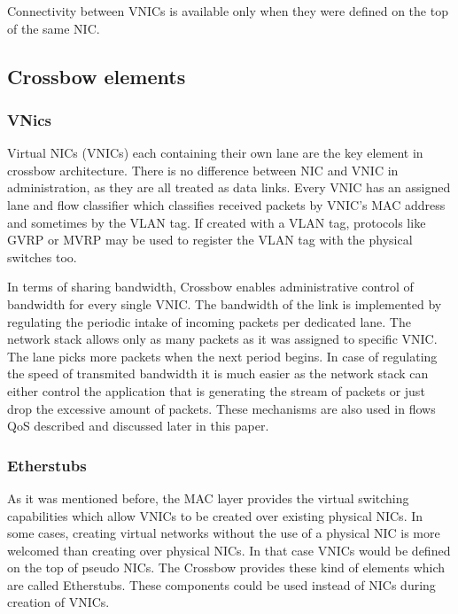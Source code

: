 \documentclass[11pt]{book}
\begin{document}
			Connectivity between VNICs is available only when they were defined on the top of the same NIC. 

		
		\subsection{Crossbow elements}

			\subsubsection{VNics}
			Virtual NICs (VNICs) each containing their own lane are the key element in crossbow architecture. There is no
			difference between NIC and VNIC in administration, as they are all treated as data links. Every VNIC has an assigned
			lane and flow classifier which classifies received packets by VNIC's MAC address and sometimes by the VLAN tag.
			If created with a VLAN tag, protocols like GVRP or MVRP may be used to register the VLAN tag with the physical switches
			too.	

			In terms of sharing bandwidth, Crossbow enables administrative control of bandwidth for every single VNIC. The bandwidth of the link
			is implemented by regulating the periodic intake of incoming packets per dedicated lane. The network stack allows only as many packets as it was 
			assigned to specific VNIC. The lane picks more packets when the next period begins. In case of regulating the speed of transmited bandwidth it is much
			easier as the network stack can either control the application that is generating the stream of packets or just drop the excessive amount of packets.
			These mechanisms are also used in flows QoS described and discussed later in this paper.

			\subsubsection{Etherstubs}

                        As it was mentioned before, the MAC layer provides the virtual switching capabilities which allow VNICs to be created over existing physical NICs.
                        In some cases, creating virtual networks without the use of a physical NIC is more welcomed than creating over physical NICs. In that case VNICs 
                        would be defined on the top of pseudo NICs. The Crossbow provides these kind of elements which are called Etherstubs. These components could be used
                        instead of NICs during creation of VNICs.
\end{document}
